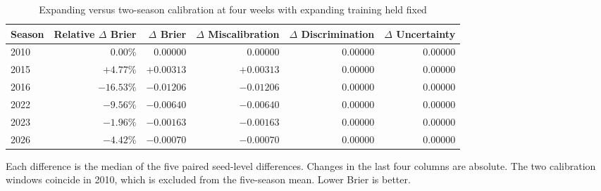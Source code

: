 \documentclass[10pt]{article}
\begin{document}
\begin{table}[!h]
\centering
\caption{Expanding versus two-season calibration at four weeks with expanding training held fixed}
\small
\begin{tabular}{@{}lrrrrr@{}}
\toprule
Season & Relative $\Delta$ Brier & $\Delta$ Brier & $\Delta$ Miscalibration & $\Delta$ Discrimination & $\Delta$ Uncertainty\\
\midrule
2010 & 0.00\% & 0.00000 & 0.00000 & 0.00000 & 0.00000\\
2015 & $+4.77\%$ & $+0.00313$ & $+0.00313$ & 0.00000 & 0.00000\\
2016 & $-16.53\%$ & $-0.01206$ & $-0.01206$ & 0.00000 & 0.00000\\
2022 & $-9.56\%$ & $-0.00640$ & $-0.00640$ & 0.00000 & 0.00000\\
2023 & $-1.96\%$ & $-0.00163$ & $-0.00163$ & 0.00000 & 0.00000\\
2026 & $-4.42\%$ & $-0.00070$ & $-0.00070$ & 0.00000 & 0.00000\\
\bottomrule
\end{tabular}

\vspace{2pt}\parbox{0.85\textwidth}{\footnotesize Each difference is the median of the five paired seed-level differences. Changes in the last four columns are absolute. The two calibration windows coincide in 2010, which is excluded from the five-season mean. Lower Brier is better.}
\end{table}
\end{document}

